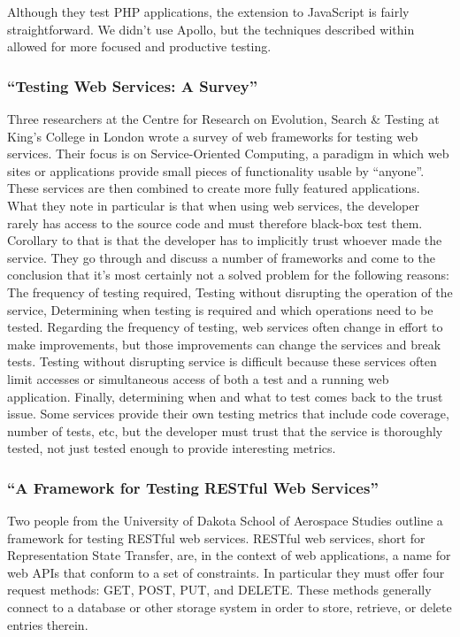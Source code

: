 \documentclass[11pt]{article}
\begin{document}
Although they test PHP applications, the extension to JavaScript is fairly straightforward. We didn't use Apollo, but the techniques described within allowed for more focused and productive testing.

\subsubsection{``Testing Web Services: A Survey'' \cite{TestingWebServicesSurvey}}
Three researchers at the Centre for Research on Evolution, Search \& Testing at King's College in London wrote a survey of web frameworks for testing web services. Their focus is on Service-Oriented Computing, a paradigm in which web sites or applications provide small pieces of functionality usable by ``anyone''. These services are then combined to create more fully featured applications. What they note in particular is that when using web services, the developer rarely has access to the source code and must therefore black-box test them. Corollary to that is that the developer has to implicitly trust whoever made the service. They go through and discuss a number of frameworks and come to the conclusion that it's most certainly not a solved problem for the following reasons: The frequency of testing required, Testing without disrupting the operation of the service, Determining when testing is required and which operations need to be tested. Regarding the frequency of testing, web services often change in effort to make improvements, but those improvements can change the services and break tests. Testing without disrupting service is difficult because these services often limit accesses or simultaneous access of both a test and a running web application. Finally, determining when and what to test comes back to the trust issue. Some services provide their own testing metrics that include code coverage, number of tests, etc, but the developer must trust that the service is thoroughly tested, not just tested enough to provide interesting metrics.

\subsubsection{``A Framework for Testing RESTful Web Services'' \cite{RESTfulFramework}}
Two people from the University of Dakota School of Aerospace Studies outline a framework for testing RESTful web services. RESTful web services, short for Representation State Transfer, are, in the context of web applications, a name for web APIs that conform to a set of constraints. In particular they must offer four request methods: GET, POST, PUT, and DELETE. These methods generally connect to a database or other storage system in order to store, retrieve, or delete entries therein.
\end{document}
